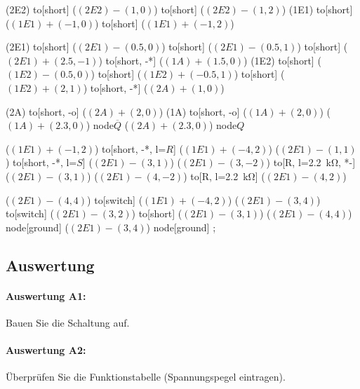 \documentclass[11pt,a4paper,titlepage,parskip=half]{scrreprt}
\begin{document}
\begin{center}
\begin{circuitikz}[scale=1]
                (2E2) to[short] ($(2E2) - (1,0)$)
                      to[short]	($(2E2) - (1,2)$)
                (1E1) to[short] ($(1E1) + (-1,0)$)
                      to[short]	($(1E1) + (-1,2)$)
                      
                (2E1) to[short] ($(2E1) - (0.5,0)$)
                      to[short] ($(2E1) - (0.5,1)$)
                      to[short] ($(2E1) + (2.5,-1)$)
                      to[short, -*] ($(1A) + (1.5,0)$)
                (1E2) to[short] ($(1E2) - (0.5,0)$)
                      to[short] ($(1E2) + (-0.5,1)$)
                      to[short] ($(1E2) + (2,1)$)
                      to[short, -*] ($(2A) + (1,0)$)
                      
                (2A) to[short, -o] ($(2A) + (2,0)$) 
                (1A) to[short, -o] ($(1A) + (2,0)$)
                ($(1A) + (2.3,0)$) node{$\overline{Q}$}
                ($(2A) + (2.3,0)$) node{$Q$}
                
                
                ($(1E1) + (-1,2)$) to[short, -*, l=$R$] ($(1E1) + (-4,2)$)
                ($(2E1) - (1,1)$) to[short, -*, l=$S$] ($(2E1) - (3,1)$)
                ($(2E1) - (3,-2)$) to[R, l=\SI{2,2}{\kilo\ohm}, *-] ($(2E1) - (3,1)$)
                ($(2E1) - (4,-2)$) to[R, l=\SI{2,2}{\kilo\ohm}] ($(2E1) - (4,2)$)
                
                ($(2E1) - (4,4)$) to[switch] ($(1E1) + (-4,2)$)
                ($(2E1) - (3,4)$) to[switch] ($(2E1) - (3,2)$)
                                  to[short] ($(2E1) - (3,1)$)
                ($(2E1) - (4,4)$)  node[ground]{}
                ($(2E1) - (3,4)$)  node[ground]{}
                ;
            \end{circuitikz}
        \end{center}
      \subsection{Auswertung}
        \paragraph{Auswertung A1:} Bauen Sie die Schaltung auf.

        \paragraph{Auswertung A2:} Überprüfen Sie die Funktionstabelle (Spannungspegel eintragen).
\end{document}
